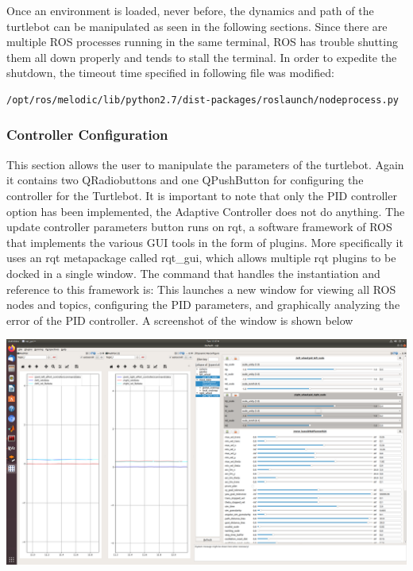 \documentclass[12]{article}
\begin{document}
Once an environment is loaded, never before, the dynamics and path of the turtlebot can be manipulated as seen in the following sections. Since there are multiple ROS processes running in the same terminal, ROS has trouble shutting them all down properly and tends to stall the terminal. In order to expedite the shutdown, the timeout time specified in following file was modified:

\begin{lstlisting}[style=bash]
/opt/ros/melodic/lib/python2.7/dist-packages/roslaunch/nodeprocess.py
\end{lstlisting}

\subsubsection{Controller Configuration}
This section allows the user to manipulate the parameters of the turtlebot. Again it contains two QRadiobuttons and one QPushButton for configuring the controller for the Turtlebot. It is important to note that only the PID controller option has been implemented, the Adaptive Controller does not do anything. The update controller parameters button runs on rqt, a software framework of ROS that implements the various GUI tools in the form of plugins. More specifically it uses an rqt metapackage called rqt\_gui, which allows multiple rqt plugins to be docked in a single window. The command that handles the instantiation and reference to this framework is:
%
This launches a new window for viewing all ROS nodes and topics, configuring the PID parameters, and graphically analyzing the error of the PID controller. A screenshot of the window is shown below
\begin{center}
\includegraphics[width=0.9\linewidth]{images/Screenshot from 2020-08-11 11-47-41.png} \\
\end{center}
\end{document}

